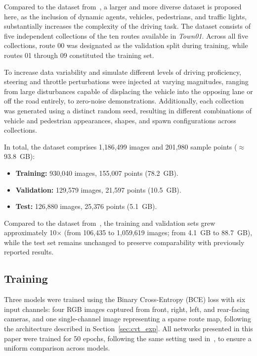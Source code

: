 \documentclass[12pt]{article}
\begin{document}
Compared to the dataset from~\cite{santos2025initial}, a larger and more diverse dataset is proposed
here, as the inclusion of dynamic agents, vehicles, pedestrians, and traffic
lights, substantially increases the complexity of the driving task.
The dataset consists of five independent collections of the ten routes available
in \textit{Town01}. Across all five collections, route 00 was designated as the
validation split during training, while routes 01 through 09 constituted the
training set.

To increase data variability and simulate different levels of driving proficiency,
steering and throttle perturbations were injected at varying magnitudes, ranging
from large disturbances capable of displacing the vehicle into the opposing lane or
off the road entirely, to zero-noise demonstrations. Additionally, each collection
was generated using a distinct random seed, resulting in different combinations of
vehicle and pedestrian appearances, shapes, and spawn configurations across
collections.  

In total, the dataset comprises 1{,}186{,}499 images and 201{,}980 sample points (${\approx}$93.8~GB):

\begin{itemize}
    \item \textbf{Training:} 930{,}040 images, 155{,}007 points (78.2~GB).
    \item \textbf{Validation:} 129{,}579 images, 21{,}597 points (10.5~GB).
    \item \textbf{Test:} 126{,}880 images, 25{,}376 points (5.1~GB).
\end{itemize}

Compared to the dataset from~\cite{santos2025initial}, the training and validation sets grew approximately 10$\times$ (from 106{,}435 to 1{,}059{,}619 images; from 4.1~GB to 88.7~GB), while the test set remains unchanged to preserve comparability with previously reported results.





\subsection{Training}

Three models were trained using the Binary Cross-Entropy (BCE) loss with six input
channels: four RGB images captured from front, right, left, and rear-facing cameras,
and one single-channel image representing a sparse route map, following the
architecture described in Section~\ref{sec:cvt_exp}. All networks presented in this paper were trained for 50 epochs, following the same setting used in~\cite{santos2025initial}, to ensure a uniform comparison across models.
\end{document}
